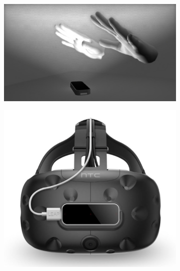 \begin{figure}[!htb]
    \begin{minipage}{\linewidth}
        \centering
        \begin{subfigure}{0.6\textwidth}
            \includegraphics[width=\linewidth]{figures/LeapView.jpg}
            \centering
        \end{subfigure}
        \label{fig:DMD}
    \end{minipage}
    \begin{minipage}{\linewidth}
        \centering
        \begin{subfigure}{0.4\textwidth}
            \centering
            \includegraphics[width=\linewidth]{figures/VRsupport.png}

\end{subfigure}
\end{minipage}
\end{figure}
